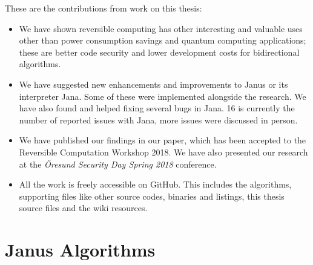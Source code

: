 \documentclass[a4paper,10pt,openright]{memoir}
\newcommand{\term}[1]{\textit{#1}}
\begin{document}
These are the contributions from work on this thesis:

\begin{itemize}

\item We have shown reversible computing has other interesting and 
valuable uses other than power consumption savings and quantum 
computing applications; these are better code security and lower 
development costs for bidirectional algorithms.

\item We have suggested new enhancements and improvements to Janus or 
its interpreter Jana. Some of these were implemented alongside the 
research. We have also found and helped fixing several bugs in Jana. 16 
is currently the number of reported issues with Jana, more issues were 
discussed in person.

\item We have published our findings in our paper\cite{revcry-paper}, which 
has been accepted to the Reversible Computation Workshop 2018. We have 
also presented our research at the \term{Öresund Security Day Spring 
2018} conference.

\item All the work is freely accessible on 
GitHub\cite{revcry-github}. This includes the algorithms, 
supporting files like other source codes, binaries and listings, this 
thesis source files and the wiki resources.

\end{itemize}




\cleardoublepage
\renewcommand{\sc}[1]{\textsc{#1}}
\nocite{*}




\cleardoublepage
\appendix

\renewcommand{\thesection}{\thechapter\arabic{section}}

\chapter{Janus Algorithms}
\label{app:algs}
\end{document}
